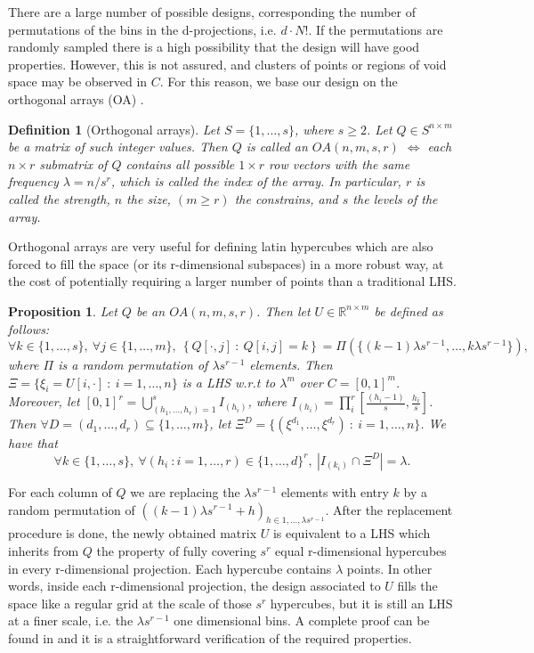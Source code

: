 \documentclass{article}
\newtheorem{definition}[theorem]{Definition}
\newtheorem{proposition}[theorem]{Proposition}
\begin{document}
There are a large number of possible designs, corresponding the number of permutations of the bins in the d-projections, i.e. $d\cdot N!$. If the permutations are randomly sampled there is a high possibility that the design will have good properties. However, this is not assured, and clusters of points or regions of void space may be observed in $C$. For this reason, we base our design on the orthogonal arrays (OA) \citep{Owen1992a,Tang1993}.

\begin{definition}[Orthogonal arrays]
Let $S=\{1,\dots,s\}$, where $s\ge 2$. Let $Q\in S^{n\times m}$ be a matrix of such integer values. Then $Q$ is called an $OA(n,m,s,r)$ $\Longleftrightarrow$ each $n\times r$ submatrix of $Q$ contains all possible $1\times r$ row vectors with the same frequency $\lambda=n/s^r$, which is called the index of the array. In particular, $r$ is called the strength, $n$ the size, $(m\ge r)$ the constrains, and $s$ the levels of the array.
\end{definition}

Orthogonal arrays are very useful for defining latin hypercubes which are also forced to fill the space (or its r-dimensional subspaces) in a more robust way, at the cost of potentially requiring a larger number of points than a traditional LHS.

\begin{proposition}
Let $Q$ be an $OA(n,m,s,r)$. Then let $U\in\mathbb R^{n\times m}$ be defined as follows:
$$\forall k\in \{1,\dots,s\},\ \forall j\in \{1,\dots,m\},\ \left\{Q[\cdot,j]\ :\ Q[i,j]=k\right\} = \Pi\left(\{(k-1)\lambda s^{r-1},\dots, k\lambda s^{r-1}\}\right),$$
where $\Pi$ is a random permutation of $\lambda s^{r-1}$ elements. Then $\Xi=\{\xi_i=U[i,\cdot]\ :\ i=1,\dots,n\}$ is a LHS w.r.t to $\lambda^m$ over $C=[0,1]^m$. Moreover, let $[0,1]^r=\bigcup_{(h_1,\dots,h_r)=1}^{s} I_{(h_i)}$, where $I_{(h_i)}=\prod^r_i[\frac{(h_i-1)}{s},\frac{h_i}{s}]$. Then $\forall D=(d_1,\dots,d_r)\subseteq \{1,\dots,m\}$, let $\Xi^D=\{(\xi^{d_1},\dots,\xi^{d_r})\ :\ i=1,\dots,n\}$. We have that
$$\forall k\in \{1,\dots,s\},\ \forall (h_i\ : i=1,\dots,r)\in\{1,\dots,d\}^r,\ \left|I_{(k_i)}\cap\Xi^D\right|=\lambda.$$
\end{proposition}

For each column of $Q$ we are replacing the $\lambda s^{r-1}$ elements with entry $k$ by a random permutation of $\left((k-1)\lambda s^{r-1} + h\right)_{h\in 1,\dots, \lambda s^{r-1}}$. After the replacement procedure is done, the newly obtained matrix $U$ is equivalent to a LHS which inherits from $Q$ the property of fully covering $s^r$ equal r-dimensional hypercubes in every r-dimensional projection. Each hypercube contains $\lambda$ points. In other words, inside each r-dimensional projection, the design associated to $U$ fills the space like a regular grid at the scale of those $s^r$ hypercubes, but it is still an LHS at a finer scale, i.e. the $\lambda s^{r-1}$ one dimensional bins. A complete proof can be found in \citep{Tang1993} and it is a straightforward verification of the required properties.
\end{document}
